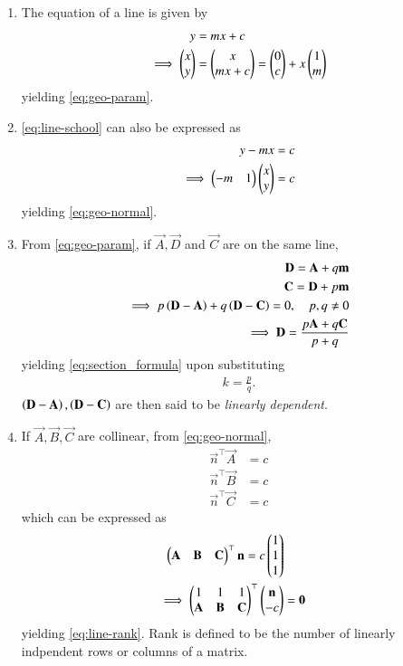 \begin{enumerate}[label=\thesection.\arabic*.,ref=\thesection.\theenumi]
\item The equation of a line is given by 
\begin{align}
			\label{eq:line-school}
	y &= mx + c
	\\
	\implies \begin{pmatrix}x \\ y\end{pmatrix} &= \begin{pmatrix}x \\ 
	 mx + c\end{pmatrix} =\begin{pmatrix}0 \\ c\end{pmatrix} + x\begin{pmatrix}1 \\ m\end{pmatrix}
\end{align}
			yielding \eqref{eq:geo-param}.
\item 			\eqref{eq:line-school} can also be expressed as
\begin{align}
	y - mx &= c 
	\\
	\implies \begin{pmatrix}-m & 1\end{pmatrix}\begin{pmatrix}x \\ y\end{pmatrix} &= c
\end{align}
			yielding \eqref{eq:geo-normal}.
  \item From \eqref{eq:geo-param}, 
	  if $\vec{A},\vec{D}$ and $\vec{C}$ are on the same line,
\begin{align}
			\mathbf{D}=\mathbf{A}+q\mathbf{m} 
			\\ 
			\mathbf{C}=\mathbf{D}+p\mathbf{m} \\
			\label{eq:collinear} 
			\implies 	p\left(\mathbf{D}-\mathbf{A}\right) 
			+ q\left(\mathbf{D}-\mathbf{C}\right) = 0, \quad p, q \ne 0 \\ 
			\implies \mathbf{D} = \frac{p\mathbf{A}+q\mathbf{C}}{p+q} 
			\end{align} 
			yielding \eqref{eq:section_formula} upon substituting \begin{align} k = \frac{p}{q}. \end{align} 
			$\left(\mathbf{D}-\mathbf{A}\right), \left(\mathbf{D}-\mathbf{C}\right)$ 
		are then said to be {\em linearly dependent}.
	\item If $\vec{A}, \vec{B}, \vec{C}$ are collinear,  from \eqref{eq:geo-normal}, \begin{align}
	 \vec{n}^{\top}\vec{A} &=  c 
	 \\
	 \vec{n}^{\top}\vec{B} &=  c 
	 \\
	 \vec{n}^{\top}\vec{C} &=  c 
\end{align}
which can be expressed as 
\begin{align}
	\begin{pmatrix} \mathbf{A} & \mathbf{B} & \mathbf{C}\end{pmatrix}^{\top}\mathbf{n} = c\begin{pmatrix}1 \\ 1 \\ 1\end{pmatrix}
	\\
	\implies 
	\begin{pmatrix} 1 & 1 &1 \\ \mathbf{A} & \mathbf{B} & \mathbf{C}\end{pmatrix}^{\top}\begin{pmatrix}\mathbf{n} \\ -c\end{pmatrix} &= \mathbf{0}
\end{align}
yielding
			\eqref{eq:line-rank}.  Rank is defined to be the number of linearly indpendent rows or columns of a matrix.


\end{enumerate}
